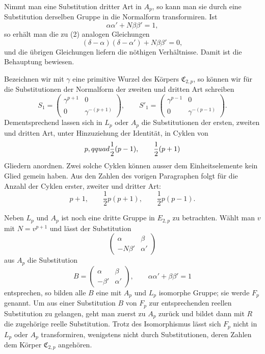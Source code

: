 \documentclass[11pt]{article}
\providecommand{\mat}[4]{\begin{pmatrix}#1&#2\\#3&#4\end{pmatrix}}
\providecommand{\mat}[4]{\begin{pmatrix}#1&#2\\#3&#4\end{pmatrix}}
\providecommand{\Cfield}{\mathfrak C}
\providecommand{\mat}[1]{\begin{pmatrix}#1\end{pmatrix}}
\begin{document}
Nimmt man eine Substitution dritter Art in $A_p$, so kann man sie durch eine Substitution derselben Gruppe in die Normalform transformiren. Ist
\begin{equation}
 \alpha\alpha'+N\beta\beta'=1,
 \tag{4}
\end{equation}
so erhält man die zu (2) analogen Gleichungen
\begin{equation}
 (\delta-\alpha)(\delta-\alpha')+N\beta\beta'=0,
 \tag{5}
\end{equation}
und die übrigen Gleichungen liefern die nöthigen Verhältnisse. Damit ist die Behauptung bewiesen.

Bezeichnen wir mit $\gamma$ eine primitive Wurzel des Körpers $\Cfield_{2,p}$, so können wir für die Substitutionen der Normalform der zweiten und dritten Art schreiben
\begin{equation}
 S_1=\mat{\gamma^{p+1}}{0}{0}{\gamma^{-(p+1)}},\qquad
 S'_1=\mat{\gamma^{p-1}}{0}{0}{\gamma^{-(p-1)}}.
 \tag{6}
\end{equation}
Dementsprechend lassen sich in $L_p$ oder $A_p$ die Substitutionen der ersten, zweiten und dritten Art, unter Hinzuziehung der Identität, in Cyklen von
\[
 p,\\qquad \frac12(p-1),\qquad \frac12(p+1)
\]
Gliedern anordnen. Zwei solche Cyklen können ausser dem Einheitselemente kein Glied gemein haben. Aus den Zahlen des vorigen Paragraphen folgt für die Anzahl der Cyklen erster, zweiter und dritter Art:
\begin{equation}
 p+1,
 \qquad \frac12p(p+1),
 \qquad \frac12p(p-1).
 \tag{7}
\end{equation}

Neben $L_p$ und $A_p$ ist noch eine dritte Gruppe in $E_{2,p}$ zu betrachten. Wählt man $v$ mit $N=v^{p+1}$ und lässt der Substitution
\[
 \mat{\alpha}{\beta}{-N\beta'}{\alpha'}
\]
aus $A_p$ die Substitution
\begin{equation}
 B=\mat{\alpha}{\beta}{-\beta'}{\alpha'},
 \qquad \alpha\alpha'+\beta\beta'=1
 \tag{8}
\end{equation}
entsprechen, so bilden alle $B$ eine mit $A_p$ und $L_p$ isomorphe Gruppe; sie werde $F_p$ genannt. Um aus einer Substitution $B$ von $F_p$ zur entsprechenden reellen Substitution zu gelangen, geht man zuerst zu $A_p$ zurück und bildet dann mit $R$ die zugehörige reelle Substitution. Trotz des Isomorphismus lässt sich $F_p$ nicht in $L_p$ oder $A_p$ transformiren, wenigstens nicht durch Substitutionen, deren Zahlen dem Körper $\Cfield_{2,p}$ angehören.
\end{document}
